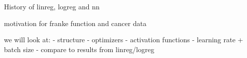 History of linreg, logreg and nn 

motivation for franke function and cancer data 

we will look at: 
- structure
- optimizers
- activation functions
- learning rate + batch size 
- compare to results from linreg/logreg 